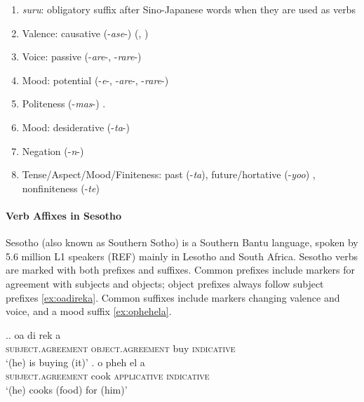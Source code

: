 \begin{enumerate}
\item \textit{suru}: obligatory suffix after Sino-Japanese words when they are used as verbs
\item Valence: causative (-\textit{ase}-) (\citet[142]{hasegawa2014japanese}, \citet[Chapter 13]{kaiser2013japanese})
\item Voice: passive (-\textit{are}-, -\textit{rare}-) \cite[152]{hasegawa2014japanese} \cite[Chapter 12]{kaiser2013japanese}
\item Mood: potential (-\textit{e}-, -\textit{are}-, -\textit{rare}-) \cite[398]{kaiser2013japanese}  
\item Politeness (-\textit{mas}-) \cite[190]{kaiser2013japanese}.
\item Mood: desiderative (-\textit{ta}-) \cite[238]{kaiser2013japanese}
\item Negation (-\textit{n}-)
\item Tense/Aspect/Mood/Finiteness: past (-\textit{ta}), future/hortative (-\textit{yoo}) \cite[229]{kaiser2013japanese}, nonfiniteness (-\textit{te}) \cite[186]{kaiser2013japanese}
\end{enumerate}







\paragraph{Verb Affixes in Sesotho}
Sesotho (also known as Southern Sotho) is a Southern Bantu language, spoken by 5.6 million L1 speakers (REF) mainly in Lesotho and South Africa.
Sesotho verbs are marked with both prefixes and suffixes.
Common prefixes include markers for agreement with subjects and objects; object prefixes always follow subject prefixes \ref{ex:oadireka}.
Common suffixes include markers changing valence and voice, and a mood suffix \ref{ex:ophehela}.

\ex.\ag. oa di rek a \\
\textsc{subject.agreement} \textsc{object.agreement} buy \textsc{indicative} \\
`(he) is buying (it)'  \cite[ex (41)]{demuth1992acquisition} \label{ex:oadireka}
\bg. o pheh el a \\
\textsc{subject.agreement} cook \textsc{applicative} \textsc{indicative} \\
`(he) cooks (food) for (him)'  \cite[ex (41)]{demuth1992acquisition}
\label{ex:ophehela}

